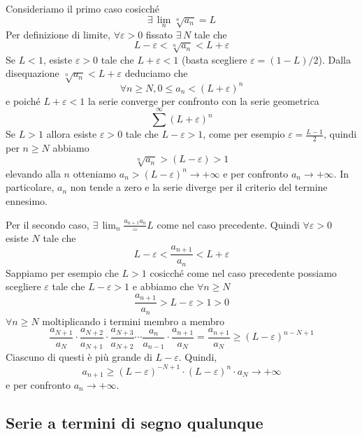 \documentclass[a4paper]{article}
\begin{document}
\begin{snippetproof}{}
    Consideriamo il primo caso cosicché
    \[
        \exists\, \lim_n \sqrt[n]{a_n} = L
    \]
    Per definizione di limite, \(\forall \varepsilon > 0\) fissato
    \(\exists\, N\) tale che
    \[
        L-\varepsilon < \sqrt[n]{a_n} < L + \varepsilon
    \]
    Se \(L < 1\), esiste \(\varepsilon > 0\) tale che
    \(L+\varepsilon < 1\) (basta scegliere \(\varepsilon = (1-L)/2\)).
    Dalla disequazione \(\sqrt[n]{a_n} < L + \varepsilon\) deduciamo che
    \[
        \forall n \geq N, 0 \leq a_n < {(L+\varepsilon)}^n
    \]
    e poiché \(L+\varepsilon<1\) la serie converge per confronto
    con la serie geometrica
    \[
        \sum^\infty {(L+\varepsilon)}^n
    \]
    Se \(L > 1\) allora esiste \(\varepsilon > 0\)
    tale che \(L - \varepsilon > 1\), come per esempio
    \(\varepsilon = \frac{L-1}{2}\), quindi per \(n\geq N\) abbiamo
    \[
        \sqrt[n]{a_n} > (L - \varepsilon) > 1
    \]
    elevando alla \(n\) otteniamo \(a_n > {(L-\varepsilon)}^n \to +\infty\)
    e per confronto \(a_n \to +\infty\).
    In particolare, \(a_n\) non tende a zero e la serie diverge per il criterio
    del termine ennesimo.

    Per il secondo caso, \(\exists\, \lim_n \frac{a_{n+1}{a_n}} = L\)
    come nel caso precedente. Quindi \(\forall \varepsilon > 0\)
    esiste \(N\) tale che 
    \[
        L - \varepsilon < \frac{a_{n+1}}{a_n} < L + \varepsilon
    \]
    Sappiamo per esempio che \(L > 1\) cosicché come nel caso precedente
    possiamo scegliere \(\varepsilon\) tale che
    \(L - \varepsilon > 1\) e abbiamo che \(\forall n \geq N\)
    \[
        \frac{a_{n+1}}{a_n} > L - \varepsilon > 1 > 0
    \]
    \(\forall n \geq N\) moltiplicando i termini membro a membro
    \[
        \frac{a_{N+1}}{a_N} \cdot
        \frac{a_{N+2}}{a_{N+1}} \cdot
        \frac{a_{N+3}}{a_{N+2}} \cdots
        \frac{a_{n}}{a_{n-1}} \cdot
        \frac{a_{n+1}}{a_{N}}
        = \frac{a_{n+1}}{a_{N}} \geq {(L-\varepsilon)}^{n-N+1}
    \]
    Ciascuno di questi è più grande di \(L - \varepsilon\).
    Quindi,
    \[
        a_{n+1} \geq {(L-\varepsilon)}^{-N+1}
        \cdot
        {(L-\varepsilon)}^n \cdot a_N \to +\infty
    \]
    e per confronto \(a_n \to +\infty\).
\end{snippetproof}

\subsection{Serie a termini di segno qualunque}
\end{document}

